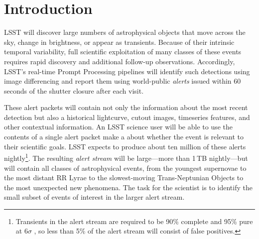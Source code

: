 \section{Introduction}\label{sec:introduction}

LSST will discover large numbers of astrophysical objects that move across the sky, change in brightness, or appear as transients.
Because of their intrinsic temporal variability, full scientific exploitation of many classes of these events requires rapid discovery and additional follow-up observations.
Accordingly, LSST's real-time Prompt Processing pipelines will identify such detections using image differencing and report them using world-public \textit{alerts} issued within 60 seconds of the shutter closure after each visit.

These alert packets will contain not only the information about the most recent detection but also a historical lightcurve, cutout images, timeseries features, and other contextual information.
An LSST science user will be able to use the contents of a single alert packet   make a    about whether the event is relevant to their scientific goals.
LSST expects to produce about ten million of these alerts nightly\footnote{Transients in the alert stream are required to be 90\% complete and 95\% pure at 6$\sigma$ , so less than 5\% of the alert stream will consist of false positives.}.
The resulting \textit{alert stream} will be large---more than 1\,TB nightly---but will contain all classes of astrophysical events, from the youngest supernovae to the most distant RR Lyrae to the slowest-moving Trans-Neptunian Objects to the most unexpected new phenomena.
The task for the scientist is to identify the small subset of events of interest in the larger alert stream.


